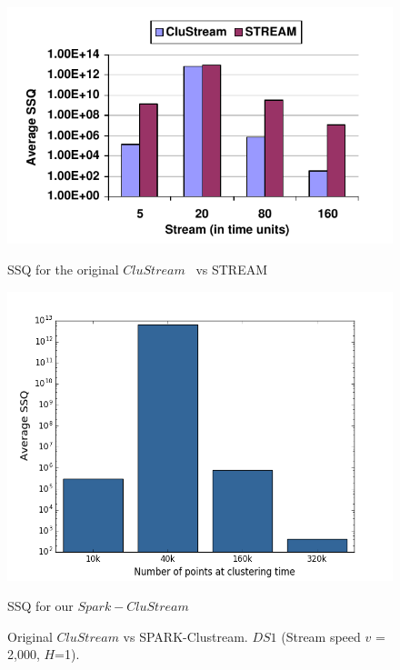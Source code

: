     \begin{figure}[!ht]
        \begin{minipage}[l]{1.0\columnwidth}
            \centering
             \includegraphics[width=0.9\columnwidth]{./styles/2000h1-orig.png}
            \caption{SSQ for the original $CluStream$~\cite{clustreamOrig} vs STREAM~\cite{}}\label{fig:2000orig}
        \end{minipage}
        \hfill{}
        \begin{minipage}[r]{1.0\columnwidth}
            \centering
            \includegraphics[width=0.9\columnwidth]{./styles/2000h1.png}
            \caption{SSQ for our $Spark-CluStream$}\label{fig:2000}
        \end{minipage}
        \captionsetup{labelformat=empty}
        \caption{Original $CluStream$ vs SPARK-Clustream.  $DS1$ (Stream speed $v$ = 2,000, $H$=1).}
        \label{fig:DS1quality}
    \end{figure}
    




